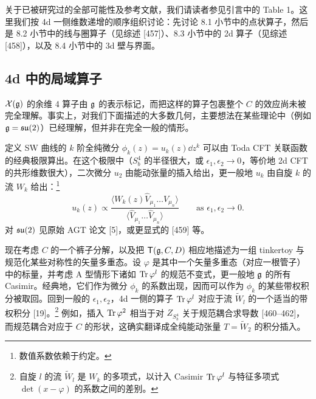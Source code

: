 关于已被研究过的全部可能性及参考文献，我们请读者参见引言中的 Table 1。这里我们按 4d 一侧维数递增的顺序组织讨论：先讨论 8.1 小节中的点状算子，然后是 8.2 小节中的线与圈算子（见综述 [457]）、8.3 小节中的 2d 算子（见综述 [458]），以及 8.4 小节中的 3d 壁与界面。

\subsection{4d 中的局域算子}

$\mathcal{X}(\mathfrak{g})$ 的余维 4 算子由 $\mathfrak{g}$ 的表示标记，而把这样的算子包裹整个 $C$ 的效应尚未被完全理解。事实上，对我们下面描述的大多数几何，主要想法在某些理论中（例如 $\mathfrak{g}=\mathfrak{su}(2)$）已经理解，但并非在完全一般的情形。

 定义 SW 曲线的 $k$ 阶全纯微分 $\phi_k(z)=u_k(z)\dd z^k$ 可以由 Toda CFT 关联函数的经典极限算出。在这个极限中（$S^4_b$ 的半径很大，或 $\epsilon_1,\epsilon_2\to0$，等价地 2d CFT 的共形维数很大），二次微分 $u_2$ 由能动张量的插入给出，更一般地 $u_k$ 由自旋 $k$ 的流 $W_k$ 给出：\footnote{数值系数依赖于约定。}
\begin{equation}
    u_k(z)\propto\frac{\langle W_k(z)\hat V_{\mu_1}\ldots\hat V_{\mu_n}\rangle}{\langle\hat V_{\mu_1}\ldots\hat V_{\mu_n}\rangle}
    \qquad\text{as }\epsilon_1,\epsilon_2\to0.
    \tag{8.1}
\end{equation}
对 $\mathfrak{su}(2)$ 见原始 AGT 论文 [5]，或更显式的 [459] 等。

现在考虑 $C$ 的一个裤子分解，以及把 $\mathsf{T}(\mathfrak{g},C,D)$ 相应地描述为一组 tinkertoy 与规范化某些对称性的矢量多重态。设 $\varphi$ 是其中一个矢量多重态（对应一根管子）中的标量，并考虑 A 型情形下诸如 $\operatorname{Tr}\varphi^l$ 的规范不变式，更一般地 $\mathfrak{g}$ 的所有 Casimir。经典地，它们作为微分 $\phi_k$ 的系数出现，因而可以作为 $\phi_k$ 的某些带权积分被取回。回到一般的 $\epsilon_1,\epsilon_2$，4d 一侧的算子 $\operatorname{Tr}\varphi^l$ 对应于流 $\tilde W_l$ 的一个适当的带权积分 [19]。\footnote{自旋 $l$ 的流 $\tilde W_l$ 是 $W_k$ 的多项式，以计入 Casimir $\operatorname{Tr}\varphi^l$ 与特征多项式 $\det(x-\varphi)$ 的系数之间的差别。} 例如，插入 $\operatorname{Tr}\varphi^2$ 相当于对 $Z_{S^4_b}$ 关于规范耦合求导数 [460--462]，而规范耦合对应于 $C$ 的形状，这确实翻译成全纯能动张量 $T=\tilde W_2$ 的积分插入。

